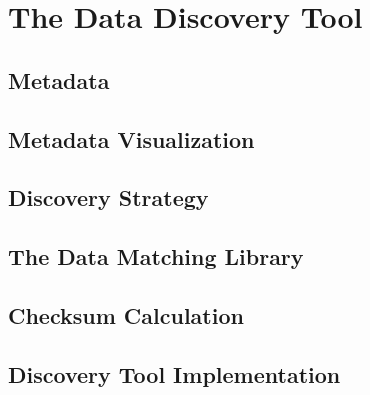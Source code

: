 \chapter{The Data Discovery Tool}\label{ch:ch2label}


\section{Metadata}\label{sec:metadata}


\section{Metadata Visualization}\label{sec:metadata-visualization}



\section{Discovery Strategy}\label{sec:discovery-strategy}



\section{The Data Matching Library}\label{sec:the-data-matching-library}



\section{Checksum Calculation}\label{sec:checksum-calculation}



\section{Discovery Tool Implementation}

